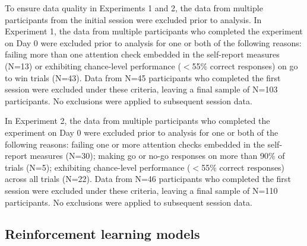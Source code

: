 \documentclass[a4paper,12pt]{article}
\begin{document}
\begin{refsection}[supp]
To ensure data quality in Experiments 1 and 2, the data from multiple participants from the initial session were excluded prior to analysis. In Experiment 1, the data from multiple participants who completed the experiment on Day 0 were excluded prior to analysis for one or both of the following reasons: failing more than one attention check embedded in the self-report measures (N=13) or exhibiting chance-level performance ($<$55\% correct responses) on go to win trials (N=43). Data from N=45 participants who completed the first session were excluded under these criteria, leaving a final sample of N=103 participants. No exclusions were applied to subsequent session data. 

In Experiment 2, the data from multiple participants who completed the experiment on Day 0 were excluded prior to analysis for one or both of the following reasons: failing one or more attention checks embedded in the self-report measures (N=30); making go or no-go responses on more than 90\% of trials (N=5); exhibiting chance-level performance ($<$55\% correct responses) across all trials (N=22). Data from N=46 participants who completed the first session were excluded under these criteria, leaving a final sample of N=110 participants. No exclusions were applied to subsequent session data. 

\subsection*{Reinforcement learning models}


\end{refsection}
\end{document}

